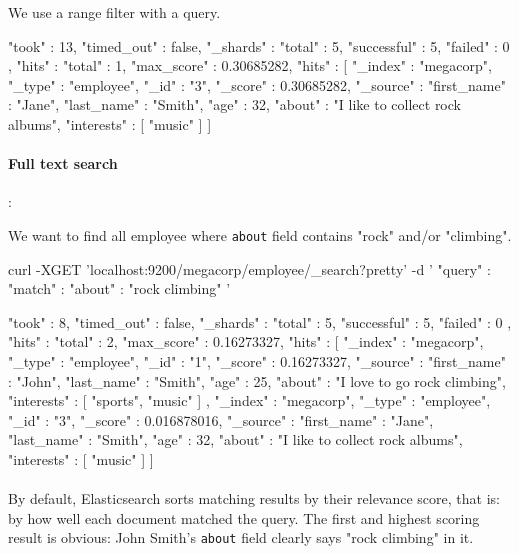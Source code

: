 \documentclass{article}%
\begin{document}
We use a range filter with a query.

\begin{command}
{
	"took" : 13,
	"timed_out" : false,
	"_shards" : {
		"total" : 5,
		"successful" : 5,
		"failed" : 0
	},
	"hits" : {
		"total" : 1,
		"max_score" : 0.30685282,
		"hits" : [ {
			"_index" : "megacorp",
			"_type" : "employee",
			"_id" : "3",
			"_score" : 0.30685282,
			"_source" : {
				"first_name" : "Jane",
				"last_name"  : "Smith",
				"age"        : 32,
				"about"      : "I like to collect rock albums",
				"interests"  : [ "music" ]
			}
		} ]
	}
}
\end{command}

\paragraph{Full text search}:

We want to find all employee where \texttt{about} field contains "rock" and/or "climbing".

\begin{command}
curl -XGET 'localhost:9200/megacorp/employee/_search?pretty' -d '
{
    "query" : {
        "match" : {
            "about" : "rock climbing"
        }
    }
}'
\end{command}

\begin{command}
{
	"took" : 8,
	"timed_out" : false,
	"_shards" : {
		"total" : 5,
		"successful" : 5,
		"failed" : 0
	},
	"hits" : {
		"total" : 2,
		"max_score" : 0.16273327,
		"hits" : [ {
			"_index" : "megacorp",
			"_type" : "employee",
			"_id" : "1",
			"_score" : 0.16273327,
			"_source" : {
				"first_name" : "John",
				"last_name"  : "Smith",
				"age"        : 25,
				"about"      : "I love to go rock climbing",
				"interests"  : [ "sports", "music" ]
			}
		}, {
			"_index" : "megacorp",
			"_type" : "employee",
			"_id" : "3",
			"_score" : 0.016878016,
			"_source" : {
				"first_name" : "Jane",
				"last_name"  : "Smith",
				"age"        : 32,
				"about"      : "I like to collect rock albums",
				"interests"  : [ "music" ]
			}
		} ]
	}
}
\end{command}

\paragraph{} By default, Elasticsearch sorts matching results by their relevance score, that is: by how well each document matched the query. The first and highest scoring result is obvious: John Smith’s \texttt{about} field clearly says "rock climbing" in it.
\end{document}
